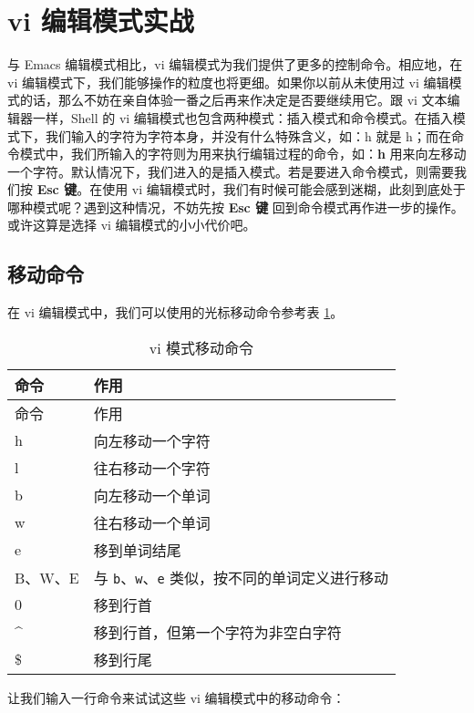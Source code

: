\documentclass[]{ctexbook}
\newenvironment{Shaded}{\begin{snugshade}}{\end{snugshade}}
\newcommand{\ExtensionTok}[1]{#1}
\newcommand{\NormalTok}[1]{#1}
\begin{document}
\hypertarget{vi-ux7f16ux8f91ux6a21ux5f0fux5b9eux6218}{%
\section{vi 编辑模式实战}\label{vi-ux7f16ux8f91ux6a21ux5f0fux5b9eux6218}}

与 Emacs 编辑模式相比，vi 编辑模式为我们提供了更多的控制命令。相应地，在 vi 编辑模式下，我们能够操作的粒度也将更细。如果你以前从未使用过 vi 编辑模式的话，那么不妨在亲自体验一番之后再来作决定是否要继续用它。跟 vi 文本编辑器一样，Shell 的 vi 编辑模式也包含两种模式：插入模式和命令模式。在插入模式下，我们输入的字符为字符本身，并没有什么特殊含义，如：h 就是 h；而在命令模式中，我们所输入的字符则为用来执行编辑过程的命令，如：\textbf{h} 用来向左移动一个字符。默认情况下，我们进入的是插入模式。若是要进入命令模式，则需要我们按 \textbf{Esc 键}。在使用 vi 编辑模式时，我们有时候可能会感到迷糊，此刻到底处于哪种模式呢？遇到这种情况，不妨先按 \textbf{Esc 键} 回到命令模式再作进一步的操作。或许这算是选择 vi 编辑模式的小小代价吧。

\hypertarget{ux79fbux52a8ux547dux4ee4}{%
\subsection{移动命令}\label{ux79fbux52a8ux547dux4ee4}}

在 vi 编辑模式中，我们可以使用的光标移动命令参考表 \ref{tab:vi-move}。

\begin{longtable}[]{@{}ll@{}}
\caption{\label{tab:vi-move} vi 模式移动命令}\tabularnewline
\toprule
命令 & 作用\tabularnewline
\midrule
\endfirsthead
\toprule
命令 & 作用\tabularnewline
\midrule
\endhead
h & 向左移动一个字符\tabularnewline
l & 往右移动一个字符\tabularnewline
b & 向左移动一个单词\tabularnewline
w & 往右移动一个单词\tabularnewline
e & 移到单词结尾\tabularnewline
B、W、E & 与 \texttt{b}、\texttt{w}、\texttt{e} 类似，按不同的单词定义进行移动\tabularnewline
0 & 移到行首\tabularnewline
\^{} & 移到行首，但第一个字符为非空白字符\tabularnewline
\$ & 移到行尾\tabularnewline
\bottomrule
\end{longtable}

让我们输入一行命令来试试这些 vi 编辑模式中的移动命令：

\begin{Shaded}
\end{Shaded}
\end{document}
